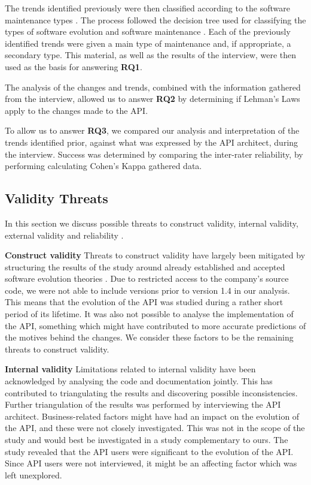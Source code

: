 \documentclass{sig-alternate}
\begin{document}
The trends identified previously were then classified according to the software maintenance types \cite{chapin2001types}. The process followed the decision tree used for classifying the types of software evolution and software maintenance \cite{chapin2001types}. Each of the previously identified trends were given a main type of maintenance and, if appropriate, a secondary type. This material, as well as the results of the interview, were then used as the basis for answering \textbf{RQ1}.

The analysis of the changes and trends, combined with the information gathered from the interview, allowed us to answer \textbf{RQ2} by determining if Lehman's Laws apply to the changes made to the API. 

To allow us to answer \textbf{RQ3}, we compared our analysis and interpretation of the trends identified prior, against what was expressed by the API architect, during the interview. Success was determined by comparing the inter-rater reliability, by performing calculating Cohen's Kappa gathered data. 





\subsection{Validity Threats} \label{validity_threats} %
In this section we discuss possible threats to construct validity, internal validity, external validity and reliability \cite{runeson2009guidelines}.

\smallskip \noindent
\textbf{Construct validity  } Threats to construct validity have largely been mitigated by structuring the results of the study around already established and accepted software evolution theories \cite{chapin2001types, lehman90sview}. Due to restricted access to the company's source code, we were not able to include versions prior to version 1.4 in our analysis. This means that the evolution of the API was studied during a rather short period of its lifetime. It was also not possible to analyse the implementation of the API, something which might have contributed to more accurate predictions of the motives behind the changes. We consider these factors to be the remaining threats to construct validity. 

\smallskip \noindent
\textbf{Internal validity  } Limitations related to internal validity have been acknowledged by analysing the code and documentation jointly. This has contributed to triangulating the results and discovering possible inconsistencies. Further triangulation of the results was performed by interviewing the API architect. Business-related factors might have had an impact on the evolution of the API, and these were not closely investigated. This was not in the scope of the study and would best be investigated in a study complementary to ours. The study revealed that the API users were significant to the evolution of the API. Since API users were not interviewed, it might be an affecting factor which was left unexplored. 
\end{document}
